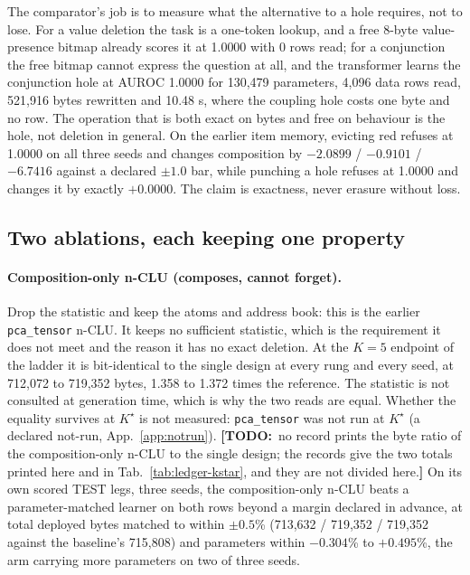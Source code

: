 \documentclass{article} %
\newcommand{\TODO}[1]{{\color{orange}\textbf{[TODO:}~#1\textbf{]}}}
\newcommand{\Kstar}{\ensuremath{K^{\star}}}
\begin{document}
\noindent The comparator's job is to measure what the alternative to a hole requires, not to lose. For a value
deletion the task is a one-token lookup, and a free 8-byte value-presence bitmap already scores
it at 1.0000 with 0 rows read; for a conjunction the free bitmap cannot express the question at
all, and the transformer learns the conjunction hole at AUROC 1.0000 for 130,479 parameters,
4,096 data rows read, 521,916 bytes rewritten and 10.48 s, where the coupling hole costs one
byte and no row. %
\noindent The operation that is both exact on bytes and free on behaviour is the hole, not
deletion in general. On the earlier item memory, evicting red refuses at 1.0000 on all three
seeds and changes composition by $-2.0899$ / $-0.9101$ / $-6.7416$ against a declared $\pm1.0$ bar,
while punching a hole refuses at 1.0000 and changes it by exactly $+0.0000$. %
The claim is exactness, never erasure without loss.

\subsection{Two ablations, each keeping one property}
\label{sec:ablations}

\paragraph{Composition-only n-CLU (composes, cannot forget).} Drop the statistic and keep the
atoms and address book: this is the earlier \texttt{pca\_tensor} n-CLU. It keeps no sufficient
statistic, which is the requirement it does not meet and the reason it has no exact deletion. At the
$K=5$ endpoint of the ladder it is bit-identical to the single design at every rung and every
seed, at 712,072 to 719,352 bytes, 1.358 to 1.372 times the reference.
The statistic is not consulted at generation time, which is why the two reads are equal.
Whether the equality survives at $\Kstar$ is not measured: \texttt{pca\_tensor} was not run at
$\Kstar$ (a declared not-run, App.~\ref{app:notrun}). \TODO{no record prints the byte ratio of the composition-only n-CLU to the single design;
the records give the two totals printed here and in Tab.~\ref{tab:ledger-kstar}, and they are
not divided here.}
On its own scored TEST legs, three seeds, the composition-only n-CLU beats a parameter-matched
learner on both rows beyond a margin declared in advance, at total deployed bytes matched to
within $\pm0.5$\% (713,632 / 719,352 / 719,352 against the baseline's 715,808) and parameters within
$-0.304$\% to $+0.495$\%, the arm carrying more parameters on two of three seeds.
\end{document}

